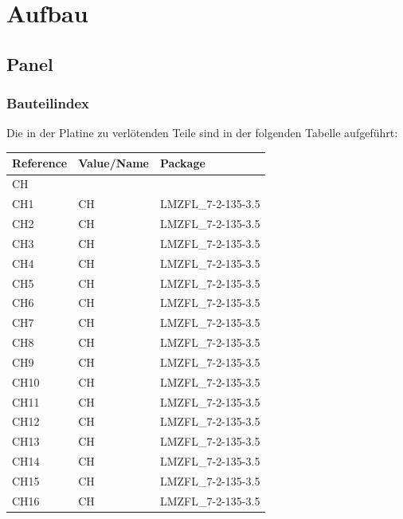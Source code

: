 \documentclass[paper=a4, open=any]{scrbook}
\begin{document}
		\chapter{Aufbau}
			\section{Panel}

				\subsection*{Bauteilindex}

					Die in der Platine zu verlötenden Teile sind in der folgenden Tabelle aufgeführt:

					\begin{longtabu}
						to \textwidth[l]{lX[-1]X}
						Reference & Value/Name             & Package                            \\ \hline\hline
						\endhead
						CH        &                        &                                    \\*
						CH1       & CH                     & LMZFL\_7-2-135-3.5                 \\
						CH2       & CH                     & LMZFL\_7-2-135-3.5                 \\
						CH3       & CH                     & LMZFL\_7-2-135-3.5                 \\
						CH4       & CH                     & LMZFL\_7-2-135-3.5                 \\
						CH5       & CH                     & LMZFL\_7-2-135-3.5                 \\
						CH6       & CH                     & LMZFL\_7-2-135-3.5                 \\
						CH7       & CH                     & LMZFL\_7-2-135-3.5                 \\
						CH8       & CH                     & LMZFL\_7-2-135-3.5                 \\
						CH9       & CH                     & LMZFL\_7-2-135-3.5                 \\
						CH10      & CH                     & LMZFL\_7-2-135-3.5                 \\
						CH11      & CH                     & LMZFL\_7-2-135-3.5                 \\
						CH12      & CH                     & LMZFL\_7-2-135-3.5                 \\
						CH13      & CH                     & LMZFL\_7-2-135-3.5                 \\
						CH14      & CH                     & LMZFL\_7-2-135-3.5                 \\
						CH15      & CH                     & LMZFL\_7-2-135-3.5                 \\
						CH16      & CH                     & LMZFL\_7-2-135-3.5                 \\
						\hline


\end{longtabu}
\end{document}
